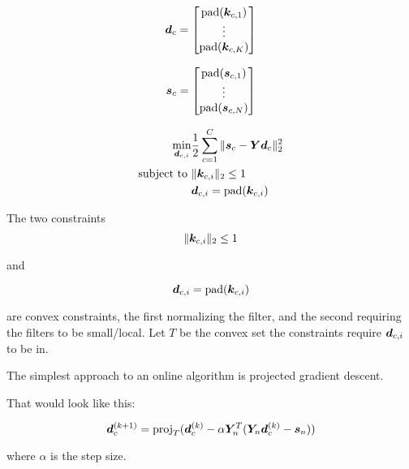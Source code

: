 \documentclass{article}
\begin{document}
\begin{equation}
\bm{d}_c = \begin{bmatrix} \operatorname{pad}(\bm{k}_{c,1}) \\
                        \vdots \\
                        \operatorname{pad}(\bm{k}_{c,K})
         \end{bmatrix}
\end{equation}

\begin{equation}
\bm{s}_c = \begin{bmatrix} \operatorname{pad}(\bm{s}_{c,1}) \\
                        \vdots \\
                        \operatorname{pad}(\bm{s}_{c,N})
         \end{bmatrix}
\end{equation}

\begin{equation}
\begin{aligned}
\min_{\bm{d}_{c,i}} & \frac{1}{2} \sum_{c = 1}^C\|\bm{s}_c - \bm{Y}\bm{d}_c\|_2^2\\
\text{subject to } & \|\bm{k}_{c,i}\|_2 \leq 1\\
                   & \bm{d}_{c,i} = \operatorname{pad}(\bm{k}_{c,i})
\end{aligned}
\end{equation}

The two constraints
\begin{equation}
\|\bm{k}_{c,i}\|_2 \leq 1
\end{equation}

and 

\begin{equation}
\bm{d}_{c,i} = \operatorname{pad}(\bm{k}_{c,i})
\end{equation}

are convex constraints, the first normalizing the filter, and the second requiring the filters to be small/local. Let $T$ be the convex set the constraints require $\bm{d}_{c,i}$ to be in.

The simplest approach to an online algorithm is projected gradient descent.

That would look like this:

\begin{equation}
\bm{d}_c^{(k + 1)} = \operatorname{proj}_{T}(\bm{d}_c^{(k)} - \alpha\bm{Y}_n^T(\bm{Y}_n\bm{d}_{c}^{(k)} - \bm{s}_n))
\end{equation}

where $\alpha$ is the step size.
\end{document}
